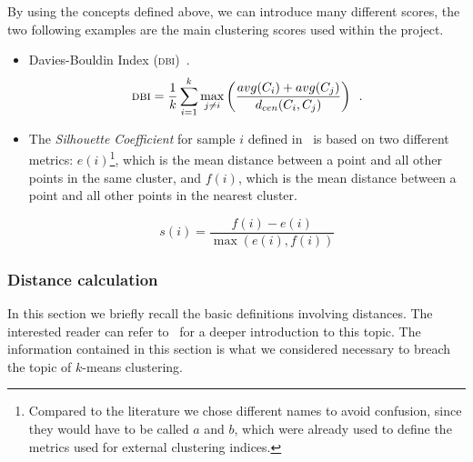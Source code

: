 By using the concepts defined above, we can introduce many different scores, the two following
examples are the main clustering scores used within the project.

\begin{itemize}
	\item Davies-Bouldin Index (\textsc{dbi})~\cite{bouldin1979}.
		\begin{equation*}
			\textsc{dbi} = \frac{1}{k}\sum_{i = 1}^k\max_{j \neq i}\left(\frac{avg(C_i)
			+ avg(C_j)}{d_{cen}(C_i, C_j)}\right) \enspace.
		\end{equation*}
	\item The \emph{Silhouette Coefficient} for sample $i$ defined in~\cite{rousseuw1987}
		is based on two different metrics: $e(i)$\footnote{
			Compared to the literature we chose different names to avoid confusion, since they would have to be called $a$ and $b$, which were already used to define the metrics used for external clustering indices.
		}, which is the mean distance between a point and all other points in the same cluster, and $f(i)$, which is the mean distance between a point and all other points in the nearest cluster.

		\begin{equation*}
			s(i) = \frac{f(i) - e(i)}{\max(e(i), f(i))}
		\end{equation*}
\end{itemize}

\subsubsection{Distance calculation}
\label{ssec:distance-calculation}
In this section we briefly recall the basic definitions involving distances. The interested reader
can refer to~\cite{} for a deeper introduction to this topic. The information contained in this section is what we considered necessary to breach the topic of $k$-means clustering.

